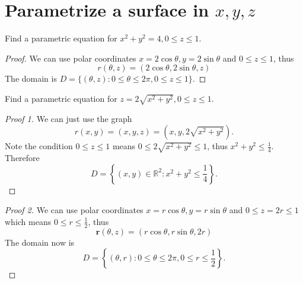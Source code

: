 \section{Parametrize a surface in $x,y,z$}
\begin{example} Find a parametric equation for $x^2+y^2 = 4, 0\leq z\leq 1$. 
\end{example}
\begin{proof} We can use polar coordinates $x = 2\cos \theta, y = 2\sin \theta$ and $0\leq z\leq 1$, thus 
\begin{equation*}
    r(\theta,z) = (2\cos \theta, 2\sin \theta, z)
\end{equation*}
The domain is $D = \{(\theta, z): 0\leq \theta \leq 2\pi, 0\leq z\leq 1\}$.
\end{proof}

\begin{example} Find a parametric equation for $z = 2\sqrt{x^2+y^2}, 0\leq z\leq 1$. 
\end{example}
\begin{proof}[Proof 1] We can just use the graph
\begin{equation*}
    r(x,y) = (x,y,z) = (x,y,2\sqrt{x^2+y^2}).
\end{equation*}
Note the condition $0\leq z\leq 1$ means $0\leq 2\sqrt{x^2+y^2}\leq 1$, thus $x^2+y^2 \leq \frac{1}{4}$. Therefore
    \begin{equation*}
        D = \left\{(x,y)\in \mathbb{R}^2: x^2+y^2 \leq \frac{1}{4}\right\}.
    \end{equation*}
\end{proof}

\begin{proof}[Proof 2] We can use polar coordinates $x = r\cos \theta, y = r\sin \theta$ and $0\leq z = 2r\leq 1$ which means $0\leq r\leq \frac{1}{2}$, thus 
\begin{equation*}
    \textbf{r}(\theta,z) = (r\cos \theta, r\sin \theta, 2r)
\end{equation*}
The domain now is 
\begin{equation*}
    D = \left\{(\theta, r): 0\leq \theta \leq 2\pi, 0\leq r\leq \frac{1}{2}\right\}.
\end{equation*}
\end{proof}



